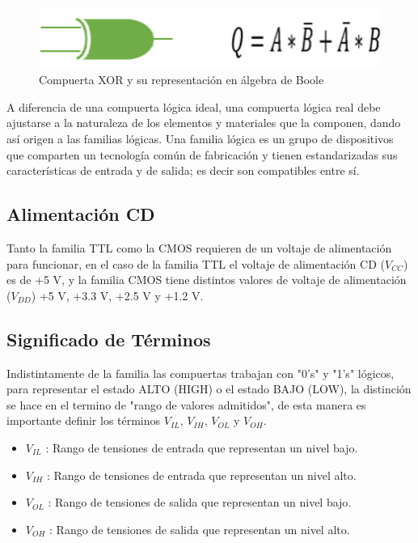\documentclass[journal]{IEEEtran}
\begin{document}
\begin{itemize}
		\begin{figure}[!htb]
			\centering
			\includegraphics[scale = 0.4]{img/XOR.png}
			\caption{Compuerta XOR y su representación en álgebra de Boole \cite{LOGICBUS}}
			\label{fig:XOR}
		\end{figure}
		
	\end{itemize}
	
	\vspace{4mm}
	
	A diferencia de una compuerta lógica ideal, una compuerta lógica real debe ajustarse a la naturaleza de los elementos y materiales que la componen, dando así origen a las familias lógicas.
	Una familia lógica es un grupo de dispositivos que comparten un tecnología común de fabricación y tienen estandarizadas sus características de entrada y de salida; es decir son compatibles entre sí.
	
	\subsection{Alimentación CD}
	Tanto la familia TTL como la CMOS requieren de un voltaje de alimentación para funcionar, en el caso de la familia TTL el voltaje de alimentación CD ($V_{CC}$) es de +5 V, y la familia CMOS tiene distintos valores de voltaje de alimentación ($V_{DD}$) +5 V, +3.3 V, +2.5 V y +1.2 V. 
	\subsection{Significado de Términos}
	Indistintamente de la familia las compuertas trabajan con "0's" y "1's" lógicos, para representar el estado ALTO (HIGH) o el estado BAJO (LOW), la distinción se hace en el termino de "rango de valores admitidos", de esta manera es importante definir los términos $V_{IL}$, $V_{IH}$, $V_{OL}$ y $V_{OH}$.
	\vspace{6mm}
	\begin{itemize}
		\item $V_{IL}$ : Rango de tensiones de entrada que representan un nivel bajo.
		\item $V_{IH}$ : Rango de tensiones de entrada que representan un nivel alto. 
		\item $V_{OL}$ : Rango de tensiones de salida que representan un nivel bajo.
		\item $V_{OH}$ : Rango de tensiones de salida que representan un nivel alto.
	\end{itemize}
	
\end{document}
